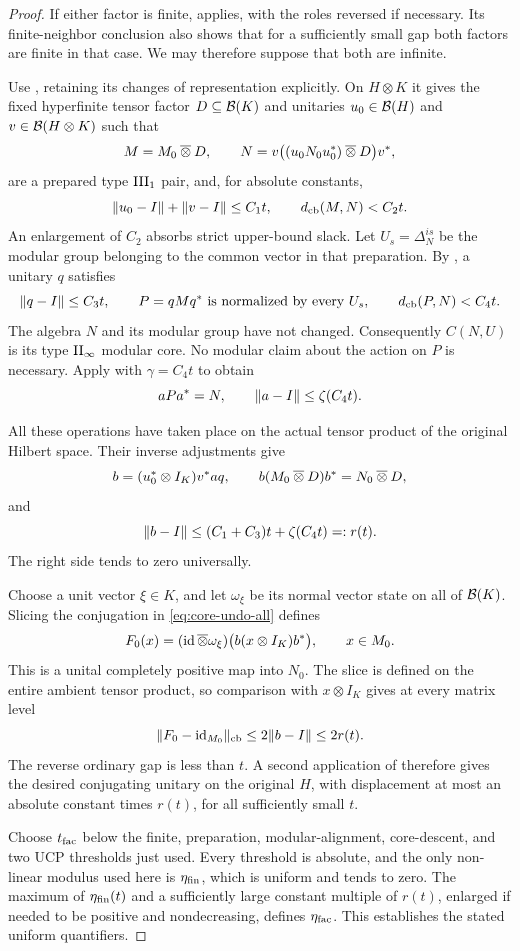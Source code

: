 \begin{proof}
If either factor is finite,  applies, with the roles
reversed if necessary.  Its finite-neighbor conclusion also shows that
for a sufficiently small gap both factors are finite in that case.
We may therefore suppose that both are infinite.

Use , retaining its changes of representation
explicitly.  On $H\otimes K$ it gives the fixed hyperfinite tensor
factor $D\subseteq\mathcal B(K)$ and unitaries $u_0\in\mathcal B(H)$ and
$v\in\mathcal B(H\otimes K)$ such that
\[
 M=M_0\mathbin{\overline\otimes} D,\qquad
 N=v\bigl((u_0N_0u_0^*)\mathbin{\overline\otimes} D\bigr)v^*,
\]
are a prepared type $\mathrm{III}_1$ pair, and, for absolute constants,
\[
 \lVert u_0-I\rVert+\lVert v-I\rVert\le C_1t,
 \qquad d_{\mathrm{cb}}(M,N)<C_2t.
\]
An enlargement of $C_2$ absorbs strict upper-bound slack.
Let $U_s=\Delta_N^{is}$ be the modular group belonging to the common
vector in that preparation.  By , a
unitary $q$ satisfies
\[
 \lVert q-I\rVert\le C_3t,\qquad
 P=qMq^*\text{ is normalized by every }U_s,
 \qquad d_{\mathrm{cb}}(P,N)<C_4t.
\]
The algebra $N$ and its modular group have not changed.  Consequently
$C(N,U)$ is its type $\mathrm{II}_\infty$ modular core.  No modular claim
about the action on $P$ is necessary.  Apply
 with $\gamma=C_4t$ to obtain
\[
 aPa^*=N,\qquad \lVert a-I\rVert\le\zeta(C_4t).
\]

All these operations have taken place on the actual tensor product
of the original Hilbert space.  Their inverse adjustments give
\begin{equation}\label{eq:core-undo-all}
 b=(u_0^*\otimes I_K)v^*aq,
 \qquad b(M_0\mathbin{\overline\otimes} D)b^*=N_0\mathbin{\overline\otimes} D,
\end{equation}
and
\begin{equation}\label{eq:core-tensor-displacement}
 \lVert b-I\rVert\le(C_1+C_3)t+\zeta(C_4t)=:r(t).
\end{equation}
The right side tends to zero universally.

Choose a unit vector $\xi\in K$, and let $\omega_\xi$ be its normal
vector state on all of $\mathcal B(K)$.  Slicing the conjugation in
\eqref{eq:core-undo-all} defines
\[
 F_0(x)=(\operatorname{id}\mathbin{\overline\otimes}\omega_\xi)
              \bigl(b(x\otimes I_K)b^*\bigr),\qquad x\in M_0.
\]
This is a unital completely positive map into $N_0$.  The slice is
defined on the entire ambient tensor product, so comparison with
$x\otimes I_K$ gives at every matrix level
\[
 \lVert F_0-\operatorname{id}_{M_0}\rVert_{\mathrm{cb}}\le2\lVert b-I\rVert\le2r(t).
\]
The reverse ordinary gap is less than $t$.  A second application of
 therefore gives the desired conjugating unitary on
the original $H$, with displacement at most an absolute constant
times $r(t)$, for all sufficiently small $t$.

Choose $t_{\rm fac}$ below the finite, preparation, modular-alignment,
core-descent, and two UCP thresholds just used.  Every threshold is
absolute, and the only non-linear modulus used here is
$\eta_{\rm fin}$, which is uniform and tends to zero.  The maximum of
$\eta_{\rm fin}(t)$ and a sufficiently large constant multiple of
$r(t)$, enlarged if needed to be positive and nondecreasing, defines
$\eta_{\rm fac}$.  This establishes the stated uniform quantifiers.
\end{proof}
